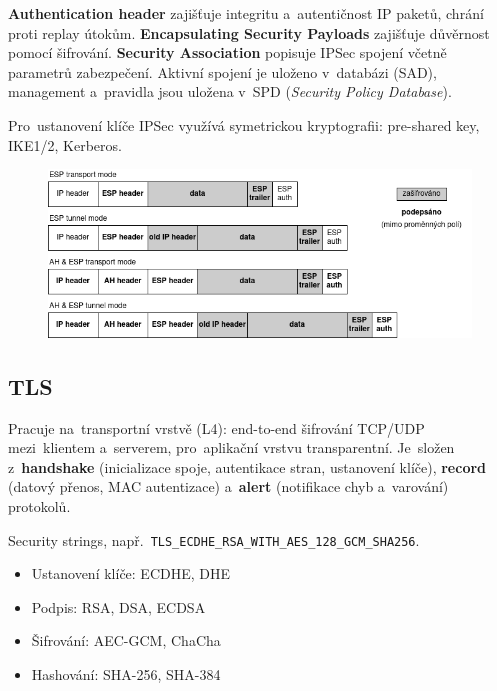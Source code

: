 \textbf{Authentication header} zajišťuje integritu a~autentičnost IP paketů, chrání proti replay útokům. \textbf{Encapsulating Security Payloads} zajišťuje důvěrnost pomocí šifrování. \textbf{Security Association} popisuje IPSec spojení včetně parametrů zabezpečení. Aktivní spojení je uloženo v~databázi (SAD), management a~pravidla jsou uložena v~SPD (\emph{Security Policy Database}).

Pro~ustanovení klíče IPSec využívá symetrickou kryptografii: pre-shared key, IKE1/2, Kerberos.

\begin{figure}[ht]
    \centering
    \includegraphics[width=\textwidth]{images/ipsec-modes}
\end{figure}

\clearpage
\subsection{TLS}

Pracuje na~transportní vrstvě (L4): end-to-end šifrování TCP/UDP mezi~klientem a~serverem, pro~aplikační vrstvu transparentní. Je~složen z~\textbf{handshake} (inicializace spoje, autentikace stran, ustanovení klíče), \textbf{record} (datový přenos, MAC autentizace) a~\textbf{alert} (notifikace chyb a~varování) protokolů.

Security strings, např.~\texttt{TLS\_ECDHE\_RSA\_WITH\_AES\_128\_GCM\_SHA256}.

\begin{itemize}[noitemsep]
    \item Ustanovení klíče: ECDHE, DHE
    \item Podpis: RSA, DSA, ECDSA
    \item Šifrování: AEC-GCM, ChaCha
    \item Hashování: SHA-256, SHA-384
\end{itemize}

